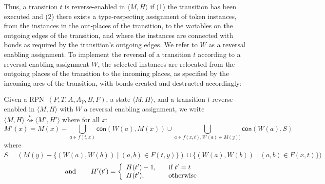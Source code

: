 \documentclass[runningheads]{llncs}
\newcommand{\connected}{\mathsf{con}}
\newcommand{\state}[2]{\langle {#1}, {#2}\rangle}
\newcommand{\rtrans}[1]{\ensuremath{\stackrel{#1}{\rightsquigarrow}}}
\newcommand{\RPN}{\textsc{RPN\ }}
\begin{document}
Thus, a transition $t$ is reverse-enabled in $\state{M}{H}$ if  
(1) the transition has been executed and (2) there exists a type-respecting assignment of token instances,
from the instances in the out-places of the transition, to the variables on the outgoing
edges of the transition, and where the instances are connected with bonds as required by
the transition's outgoing edges.  
We refer to $W$ as a reversal enabling assignment.
To implement the reversal of a transition $t$ according to a reversal enabling assignment $W$, 
the selected instances are relocated from  the outgoing places of the transition to the incoming places,
as specified
by the incoming arcs of the transition, with bonds created and destructed accordingly:

\begin{definition}\label{causal}{\rm
		Given a \RPN $(P,T, A, A_V, B, F)$, 
		a state $\langle M, H\rangle$, and a transition $t$ reverse-enabled in $\state{M}{H}$  with 
		$W$ a reversal enabling assignment, we write $ \state{M}{H}
		\rtrans{t} \state{M'}{H'}$   where for all $x$:
		\[
		M'(x) =   M(x)- \bigcup_{a\in f(t,x)} \connected(W(a), M(x)) 
		\cup  \bigcup_{a\in f(x,t),W(a)\in M(y))} \connected(W(a),S)\]
		where $S= (M(y)
		-\{(W(a),W(b))\mid (a,b)\in F(t,y)\})\cup \{ (W(a),W(b))\mid (a,b)\in F(x,t) \})$
		\[
		\hspace{0.3in}\mbox{and}\hspace{0.3in}
		H'(t') = \left\{
		\begin{array}{ll}
		H(t') - 1, \hspace{0.3cm} \;\;\textrm{ if } t' = t  \; \\
		H(t'),\hspace{1cm}  \;\textrm{ otherwise }
		\end{array}
		\right.
		\]
}\end{definition}	
\end{document}
